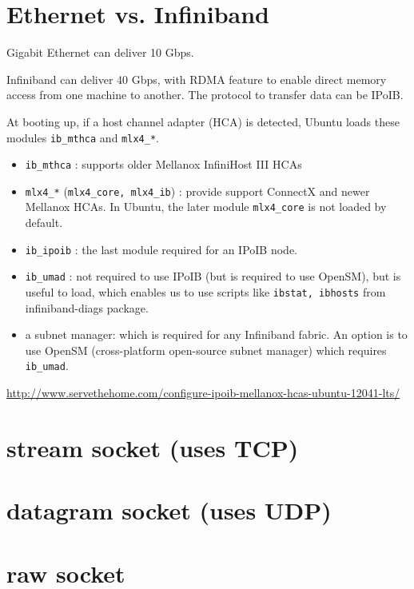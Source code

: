 \section{Ethernet vs. Infiniband}

Gigabit Ethernet can deliver 10 Gbps.

Infiniband can deliver 40 Gbps, with RDMA feature to enable direct memory access
from one machine to another. The protocol to transfer data can be IPoIB. 

At booting up, if a host channel adapter (HCA) is detected, Ubuntu loads these
modules \verb!ib_mthca! and \verb!mlx4_*!. 
\begin{itemize}
  \item \verb!ib_mthca! : supports older Mellanox InfiniHost III HCAs
  \item \verb!mlx4_*! (\verb!mlx4_core, mlx4_ib!) : provide support ConnectX and
  newer Mellanox HCAs. In Ubuntu, the later module \verb!mlx4_core! is not
  loaded by default. 
  
  \item \verb!ib_ipoib! : the last module required for an IPoIB node.
  
  \item \verb!ib_umad! : not required to use IPoIB (but is required to use
  OpenSM), but is useful to load, which enables us to use scripts like
  \verb!ibstat, ibhosts! from infiniband-diags package.
  
  \item a subnet manager: which is required for any Infiniband fabric. An option
  is to use OpenSM (cross-platform open-source subnet manager) which requires
  \verb!ib_umad!. 
\end{itemize}
\url{http://www.servethehome.com/configure-ipoib-mellanox-hcas-ubuntu-12041-lts/}



\section{stream socket (uses TCP)}


\section{datagram socket (uses UDP)}


\section{raw socket}



